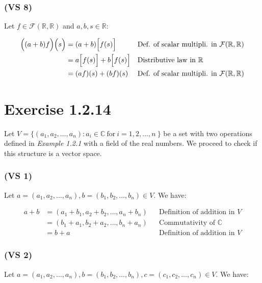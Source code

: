 \documentclass{article}
\begin{document}
\subsubsection*{(VS 8)}

Let \(f \in \mathcal{F}(\mathbb{R}, \mathbb{R})\) and \( a, b, s \in \mathbb{R}\):

\begin{align*}
    \Big((a + b)f\Big)\Big(s\Big) &= (a+b)\Big[f(s)\Big] && \text{\text{Def. of scalar multipli. in \(\mathcal{F}(\mathbb{R}, \mathbb{R})\)}}\\
    &= a\Big[f(s)\Big] + b\Big[f(s)\Big] && \text{Distributive law in \(\mathbb{R}\)} \\ 
    &= (af)(s) + (bf)(s) && \text{\text{Def. of scalar multipli. in \(\mathcal{F}(\mathbb{R}, \mathbb{R})\)}}\\
\end{align*}

\section*{Exercise 1.2.14}

Let \(V = \{(a_{1}, a_{2}, \dots, a_{n}): a_{i} \in \mathbb{C} \  \text{for}  \ i = 1, 2, \dots, n \ \}\) 
be a set with two operations defined in \emph{Example 1.2.1} with a field of the real numbers. 
We proceed to check if this structure is a vector space.

\subsubsection*{(VS 1)}

Let \(a = (a_{1}, a_{2}, \dots, a_{n}), b = (b_{1}, b_{2}, \dots, b_{n}) \in V\). We have:

\begin{align*}
    a + b  &=  (a_{1} + b_{1}, a_{2} + b_{2}, \dots, a_{n} + b_{n}) && \text{Definition of addition in \(V\)} \\
    &= (b_{1} + a_{1}, b_{2} + a_{2}, \dots, b_{n} + a_{n}) && \text{Commutativity of \(\mathbb{C}\)} \\ 
    &= b + a && \text{Definition of addition in \(V\)}
\end{align*}

\subsubsection*{(VS 2)}

Let \(a = (a_{1}, a_{2}, \dots, a_{n}), b = (b_{1}, b_{2}, \dots, b_{n}), c = (c_{1}, c_{2}, \dots, c_{n}) \in V\). We have:
\end{document}
